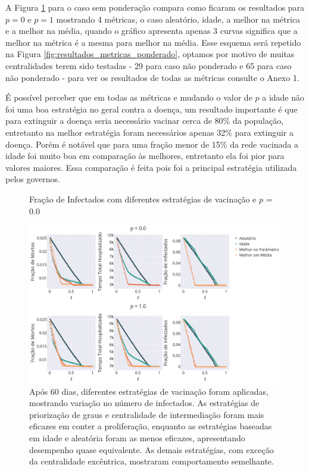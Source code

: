 A Figura \ref{fig:resultados_metricas} para o caso sem ponderação compara como ficaram os resultados para $p = 0$ e $p = 1$ mostrando 4 métricas, o caso aleatório, idade, a melhor na métrica e a melhor na média, quando o gráfico apresenta apenas 3 curvas significa que a melhor na métrica é a mesma para melhor na média. Esse esquema será repetido na Figura \ref{fig:resultados_metricas_ponderado}, optamos por motivo de muitas centralidades terem sido testadas - 29 para caso não ponderado e 65 para caso não ponderado - para ver os resultados de todas as métricas consulte o Anexo 1.

É possível perceber que em todas as métricas e mudando o valor de $p$ a idade não foi uma boa estratégia no geral contra a doença, um resultado importante é que para extinguir a doença seria necessário vacinar cerca de 80\% da população, entretanto na melhor estratégia foram necessários apenas 32\% para extinguir a doença. Porém é notável que para uma fração menor de 15\% da rede vacinada a idade foi muito boa em comparação às melhores, entretanto ela foi pior para valores maiores. Essa comparação é feita pois foi a principal estratégia utilizada pelos governos.

\begin{figure}[H]
    \centering
    \captionsetup{font=normalsize,skip=0.8pt,singlelinecheck=on,labelsep=endash}
    \caption{Fração de Infectados com diferentes estratégias de vacinação e $p$ = 0.0}
    \includegraphics[scale= 0.45]{figuras/cmpara_p_f.png}
    \captionsetup{font=small,justification=justified}
    
    \caption*{ Após 60 dias, diferentes estratégias de vacinação foram aplicadas, mostrando variação no número de infectados. As estratégias de priorização de graus e centralidade de intermediação foram mais eficazes em conter a proliferação, enquanto as estratégias baseadas em idade e aleatória foram as menos eficazes, apresentando desempenho quase equivalente. As demais estratégias, com exceção da centralidade excêntrica, mostraram comportamento semelhante.}
    \label{fig:resultados_metricas}
\end{figure}

